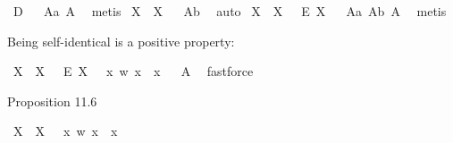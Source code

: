 \begin{isabellebody}
\isanewline
{}\isamarkupfalse%
\ {\isachardoublequoteopen}{\isasymlfloor}D{\isasymrfloor}{\isachardoublequoteclose}%
\isadelimproof
\ %
\endisadelimproof
%
\isatagproof
{}\isamarkupfalse%
\ A{}a\ A{}\ \isamarkupfalse%
\ metis%
\endisatagproof
{\isafoldproof}%
%
\isadelimproof
%
\endisadelimproof
%
\isamarkuptrue%
\isamarkupfalse%
\ {\isachardoublequoteopen}{\isasymlfloor}\isactrlbold {\isasymexists}X{\isachardot}\ {\isasymP}\ X{\isasymrfloor}{\isachardoublequoteclose}%
\isadelimproof
\ %
\endisadelimproof
%
\isatagproof
{}\isamarkupfalse%
\ A{}b\ \isamarkupfalse%
\ auto%
\endisatagproof
{\isafoldproof}%
%
\isadelimproof
%
\endisadelimproof
\isanewline
{}\isamarkupfalse%
\ {\isachardoublequoteopen}{\isasymlfloor}\isactrlbold {\isasymexists}X{\isachardot}\ {\isasymP}\ X\ \isactrlbold {\isasymand}\ \ \isactrlbold {\isasymdiamond}\isactrlbold {\isasymexists}\isactrlsup E\ X{\isasymrfloor}{\isachardoublequoteclose}%
\isadelimproof
\ %
\endisadelimproof
%
\isatagproof
{}\isamarkupfalse%
\ A{}a\ A{}b\ A{}\ \isamarkupfalse%
\ metis%
\endisatagproof
{\isafoldproof}%
%
\isadelimproof
%
\endisadelimproof
%
\begin{isamarkuptext}%
Being self-identical is a positive property:%
\end{isamarkuptext}\isamarkuptrue%
\isamarkupfalse%
\ {\isachardoublequoteopen}{\isasymlfloor}{\isacharparenleft}\isactrlbold {\isasymexists}X{\isachardot}\ {\isasymP}\ X\ \isactrlbold {\isasymand}\ \ \isactrlbold {\isasymdiamond}\isactrlbold {\isasymexists}\isactrlsup E\ X{\isacharparenright}\ \isactrlbold {\isasymrightarrow}\ {\isasymP}\ {\isacharparenleft}{\isasymlambda}x\ w{\isachardot}\ x\ {\isacharequal}\ x{\isacharparenright}{\isasymrfloor}{\isachardoublequoteclose}%
\isadelimproof
\ %
\endisadelimproof
%
\isatagproof
{}\isamarkupfalse%
\ A{}\ \isamarkupfalse%
\ fastforce%
\endisatagproof
{\isafoldproof}%
%
\isadelimproof
%
\endisadelimproof
%
\begin{isamarkuptext}%
Proposition 11.6%
\end{isamarkuptext}\isamarkuptrue%
\isamarkupfalse%
\ {\isachardoublequoteopen}{\isasymlfloor}{\isacharparenleft}\isactrlbold {\isasymexists}X{\isachardot}\ {\isasymP}\ X{\isacharparenright}\ \isactrlbold {\isasymrightarrow}\ {\isasymP}\ {\isacharparenleft}{\isasymlambda}x\ w{\isachardot}\ x\ {\isacharequal}\ x{\isacharparenright}{\isasymrfloor}{\isachardoublequoteclose}%

\end{isabellebody}
